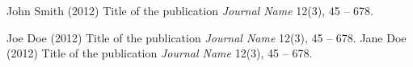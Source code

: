 \documentclass[aspectratio=169,xcolor=dvipsnames, t]{beamer}
\begin{document}
\begin{frame}{}
    \footnotesize{
        \begin{thebibliography}{99}
             John Smith (2012)
            \newblock Title of the publication
            \newblock \emph{Journal Name} 12(3), 45 -- 678.

             Joe Doe (2012)
            \newblock Title of the publication
            \newblock \emph{Journal Name} 12(3), 45 -- 678.
             Jane Doe (2012)
            \newblock Title of the publication
            \newblock \emph{Journal Name} 12(3), 45 -- 678.
        \end{thebibliography}
    }
\end{frame}

\makefinalpage
\end{document}
